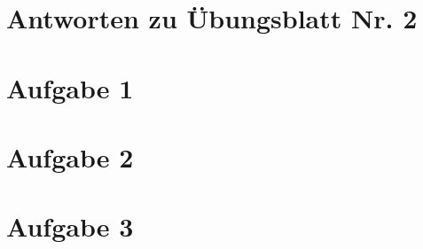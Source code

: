 \documentclass{scrartcl}
\begin{document}
\section*{Antworten zu Übungsblatt Nr. 2}

\section*{Aufgabe 1}
\section*{Aufgabe 2}
\section*{Aufgabe 3}
\end{document}
